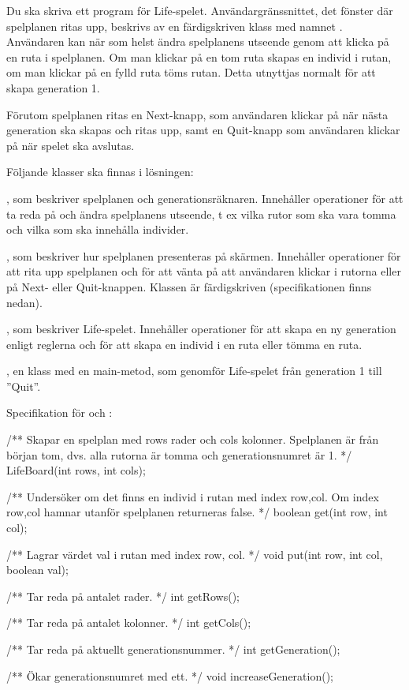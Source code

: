 Du ska skriva ett program för Life-spelet. Användargränssnittet, det fönster där spelplanen ritas upp, beskrivs av en färdigskriven klass med namnet . Användaren kan när som helst ändra spelplanens utseende genom att klicka på en ruta i spelplanen. Om man klickar på en tom ruta skapas en individ i rutan, om man klickar på en fylld ruta töms rutan. Detta utnyttjas normalt för att skapa generation 1.

Förutom spelplanen ritas en Next-knapp, som användaren klickar på när nästa generation ska skapas och ritas upp, samt en Quit-knapp som användaren klickar på när spelet ska avslutas.

Följande klasser ska finnas i lösningen:

, som beskriver spelplanen och generationsräknaren. Innehåller operationer för att ta reda på och ändra spelplanens utseende, t ex vilka rutor som ska vara tomma och vilka som ska innehålla individer.

, som beskriver hur spelplanen presenteras på skärmen. Innehåller operationer för att rita upp spelplanen och för att vänta på att användaren klickar i rutorna eller på Next- eller Quit-knappen. Klassen är färdigskriven (specifikationen finns nedan).

, som beskriver Life-spelet. Innehåller operationer för att skapa en ny generation enligt reglerna och för att skapa en individ i en ruta eller tömma en ruta.

, en klass med en main-metod, som genomför Life-spelet från generation 1 till ''Quit''.

Specifikation för  och :

\begin{Spec}
/** Skapar en spelplan med rows rader och cols kolonner. Spelplanen är från
    början tom, dvs. alla rutorna är tomma och generationsnumret är 1. */
LifeBoard(int rows, int cols);

/** Undersöker om det finns en individ i rutan med index row,col. Om
    index row,col hamnar utanför spelplanen returneras false. */
boolean get(int row, int col);

/** Lagrar värdet val i rutan med index row, col. */
void put(int row, int col, boolean val);

/** Tar reda på antalet rader. */
int getRows();

/** Tar reda på antalet kolonner. */
int getCols();

/** Tar reda på aktuellt generationsnummer. */
int getGeneration();

/** Ökar generationsnumret med ett. */
void increaseGeneration();
\end{Spec}

